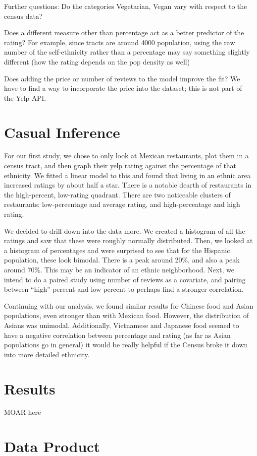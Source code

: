 \documentclass[11pt,twocolumn]{article}
\begin{document}
Further questions:
Do the categories Vegetarian, Vegan vary with respect to the census data?

Does a different measure other than percentage act as a better predictor of the rating? For example, since tracts are around 4000 population, using the raw number of the self-ethnicity rather than a percentage may say something slightly different (how the rating depends on the pop density as well)

Does adding the price or number of reviews to the model improve the fit? We have to find a way to incorporate the price into the dataset; this is not part of the Yelp API.

\section{Casual Inference}

For our first study, we chose to only look at Mexican restaurants, plot them in a census tract, and then graph their yelp rating against the percentage of that ethnicity. We fitted a linear model to this and found that living in an ethnic area increased ratings by about half a star. There is a notable dearth of restaurants in the high-percent, low-rating quadrant. There are two noticeable clusters of restaurants; low-percentage and average rating, and high-percentage and high rating.

We decided to drill down into the data more. We created a histogram of all the ratings and saw that these were roughly normally distributed. Then, we looked at a histogram of percentages and were surprised to see that for the Hispanic population, these look bimodal. There is a peak around 20\%, and also a peak around 70\%. This may be an indicator of an ethnic neighborhood. Next, we intend to do a paired study using number of reviews as a covariate, and pairing between “high” percent and low percent to perhaps find a stronger correlation.

Continuing with our analysis, we found similar results for Chinese food and Asian populations, even stronger than with Mexican food. However, the distribution of Asians was unimodal. Additionally, Vietnamese and Japanese food seemed to have a negative correlation between percentage and rating (as far as Asian populations go in general) it would be really helpful if the Census broke it down into more detailed ethnicity.

\section{Results}
MOAR here


\section{Data Product}
\end{document}
